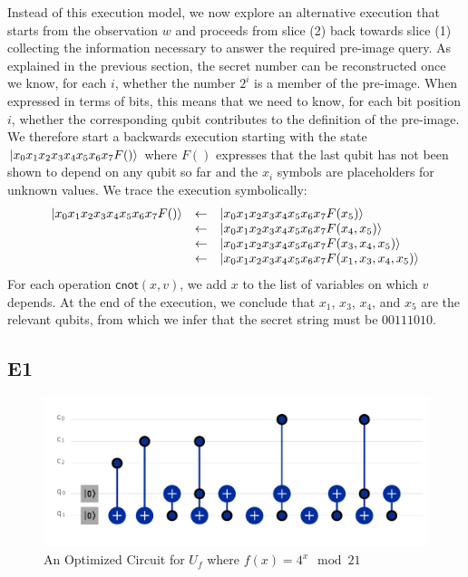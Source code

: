 \documentclass{article}
\newcommand{\cnot}{\textsf{cnot}}
\begin{document}
Instead of this execution model, we now explore an alternative
execution that starts from the observation $w$ and proceeds from slice
(2) back towards slice (1) collecting the information necessary to
answer the required pre-image query. As explained in the previous
section, the secret number can be reconstructed once we know, for each
$i$, whether the number $2^i$ is a member of the pre-image. When
expressed in terms of bits, this means that we need to know, for each
bit position $i$, whether the corresponding qubit contributes to the
definition of the pre-image. We therefore start a backwards execution
starting with the state $\ket{x_0x_1x_2x_3x_4x_5x_6x_7F()}$ where
$F()$ expresses that the last qubit has not been shown to depend on
any qubit so far and the $x_i$ symbols are placeholders for unknown
values. We trace the execution symbolically:
\[\begin{array}{rcl}
\ket{x_0x_1x_2x_3x_4x_5x_6x_7F()} &\leftarrow& \ket{x_0x_1x_2x_3x_4x_5x_6x_7F(x_5)} \\
&\leftarrow& \ket{x_0x_1x_2x_3x_4x_5x_6x_7F(x_4,x_5)} \\
&\leftarrow& \ket{x_0x_1x_2x_3x_4x_5x_6x_7F(x_3,x_4,x_5)} \\
&\leftarrow& \ket{x_0x_1x_2x_3x_4x_5x_6x_7F(x_1,x_3,x_4,x_5)}
\end{array}\]
For each operation $\cnot(x,v)$, we add $x$ to the list of variables
on which $v$ depends. At the end of the execution, we conclude that
$x_1$, $x_3$, $x_4$, and $x_5$ are the relevant qubits, from which we
infer that the secret string must be $00111010$.

\subsection{E1}

\begin{figure}[t]
    \centering
    \includegraphics[scale=0.7]{factor.pdf}
    \caption{An Optimized Circuit for $U_f$ where $f(x) = 4^x \mod{21}$}
    \label{fig:factor}
\end{figure}
\end{document}
